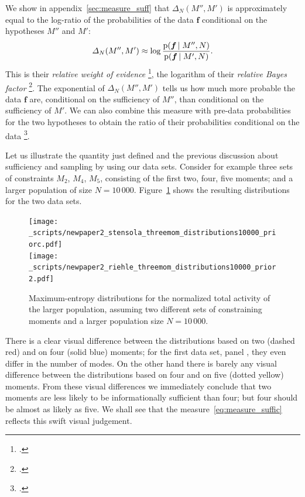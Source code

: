 \documentclass[\ifafour a4paper,12pt,\else a5paper,10pt,\fi%
onecolumn,oneside,article,%
british%
]{memoir}
\theoremstyle{remark}
\theoremstyle{innote}
\newcommand*{\citep}{\footcites}
\newcommand*{\pf}{\mathrm{p}}%
\renewcommand*{\|}{\nonscript\,\vert\nonscript\;\mathopen{}}
\newcommand*{\sect}{\S}%
\newcommand*{\chap}{ch.}%
\newcommand*{\chaps}{chs}%
\newcommand*{\cf}{{cf.}}
\newcommand*{\yff}{f}
\newcommand*{\yf}{\bm{\yff}}
\newcommand*{\ydi}{\varDelta}
\begin{document}
We show in appendix~\ref{sec:measure_suff} that $\ydi_{N}(M'',M')$ is
approximately equal to the log-ratio of the probabilities of the data $\yf$
conditional on the hypotheses $M''$ and $M'$:
\begin{equation}
  \label{eq:bayes_factor}
  \ydi_{N}(M'',M') \approx
  \log\frac{\pf(\yf \| M'',N)}{\pf(\yf \| M',N)}.
\end{equation}
This is their \emph{relative weight of evidence}
\citep[\chap~6]{good1950}{good1985}[\sect~1.4]{osteyeeetal1974}, the
logarithm of their \emph{relative Bayes factor}
\citep[p.~421]{jeffreys1936}[and references
therein]{kassetal1995}. %
The exponential of $\ydi_{N}(M'',M')$ tells us how much more probable the
data $\yf$ are, conditional on the sufficiency of $M''$, than conditional
on the sufficiency of $M'$. We can also combine this measure with pre-data
probabilities for the two hypotheses to obtain the ratio of their
probabilities conditional on the data \citep[\cf][]{bretthorst2013}.


\bigskip

Let us illustrate the quantity just defined and the previous discussion
about sufficiency and sampling by using our data sets. Consider for example
three sets of constraints $M_{2}$, $M_{4}$, $M_{5}$, consisting of the
first two, four, five moments; and a larger population of size $N=10\,000$.
Figure~\ref{fig:plots_2_4mom} shows the resulting distributions for the two
data sets.
\begin{figure}[!p]
\centering
\subcaption[]{\label{fig:plots_2_4mom_a}}%
\texttt{[image: \_scripts/newpaper2\_stensola\_threemom\_distributions10000\_priorc.pdf]}%
\\[2em]%
\subcaption[]{\label{fig:plots_2_4mom_b}}%
\texttt{[image: \_scripts/newpaper2\_riehle\_threemom\_distributions10000\_prior2.pdf]}%
\\[2em]%
\caption{Maximum-entropy distributions for the normalized total activity of
  the larger population, assuming two different sets of constraining moments
  and a larger population size $N=10\,000$.}
\label{fig:plots_2_4mom}
\end{figure}
There is a clear visual difference between the distributions based on two
(\textcolor{myred}{dashed red}) and on four (\textcolor{myblue}{solid
  blue}) moments; for the first data set, panel
, they even differ in the number of
modes. On the other hand there is barely any visual difference between the
distributions based on four and on five (\textcolor{myyellow}{dotted
  yellow}) moments. From these visual differences we immediately conclude
that two moments are less likely to be informationally sufficient than
four; but four should be almost as likely as five. We shall see that the
measure~\eqref{eq:measure_suffic} reflects this swift visual judgement.
\end{document}
